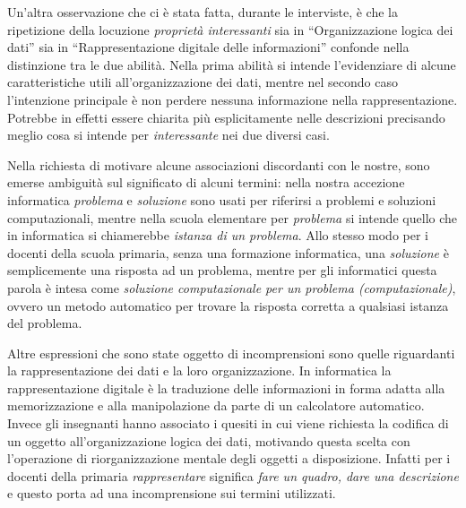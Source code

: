 \documentclass[12pt]{report}
\begin{document}
Un'altra osservazione che ci è stata fatta, durante le interviste, è che la ripetizione della locuzione \textit{proprietà interessanti} sia in ``Organizzazione logica dei dati'' sia in ``Rappresentazione digitale delle informazioni'' confonde nella distinzione tra le due abilità. Nella prima abilità si intende l'evidenziare di alcune caratteristiche utili all'organizzazione dei dati, mentre nel secondo caso l'intenzione principale è non perdere nessuna informazione nella rappresentazione. Potrebbe in effetti essere chiarita più esplicitamente nelle descrizioni precisando meglio cosa si intende per \textit{interessante} nei due diversi casi.


Nella richiesta di motivare alcune associazioni discordanti con le nostre, sono emerse ambiguità sul significato di alcuni termini: nella nostra accezione informatica \textit{problema} e \textit{soluzione} sono usati per riferirsi a problemi e soluzioni computazionali, mentre nella scuola elementare per \textit{problema} si intende quello che in informatica si chiamerebbe \textit{istanza di un problema}. Allo stesso modo per i docenti della scuola primaria, senza una formazione informatica, una \textit{soluzione} è semplicemente una risposta ad un problema, mentre per gli informatici questa parola è intesa come \textit{soluzione computazionale per un problema (computazionale)}, ovvero un metodo automatico per trovare la risposta corretta a qualsiasi istanza del problema. 

Altre espressioni che sono state oggetto di incomprensioni sono quelle riguardanti la rappresentazione dei dati e la loro organizzazione. In informatica la rappresentazione digitale è la traduzione delle informazioni in forma adatta alla memorizzazione e alla manipolazione da parte di un calcolatore automatico. Invece gli insegnanti hanno associato i quesiti in cui viene richiesta la codifica di un oggetto all'organizzazione logica dei dati, motivando questa scelta con l'operazione di riorganizzazione mentale degli oggetti a disposizione. Infatti per i docenti della primaria \textit{rappresentare} significa \textit{fare un quadro, dare una descrizione} e questo porta ad una incomprensione sui termini utilizzati. 
\end{document}
